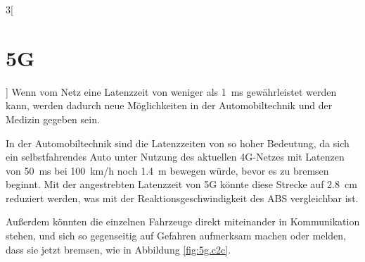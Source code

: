 \begin{multicols}{3}[\section{5G}]
Wenn vom Netz eine Latenzzeit von weniger als \SI{1}{\milli\second} gewährleistet werden kann, werden dadurch neue Möglichkeiten in der Automobiltechnik und der Medizin gegeben sein.

In der Automobiltechnik sind die Latenzzeiten von so hoher Bedeutung, da sich ein selbstfahrendes Auto unter Nutzung des aktuellen 4G-Netzes mit Latenzen von \SI{50}{\milli\second} bei \SI{100}{\kilo\metre /\hour} noch \SI{1.4}{\metre} bewegen würde, bevor es zu bremsen beginnt. Mit der angestrebten Latenzzeit von 5G könnte diese Strecke auf \SI{2.8}{\centi\metre} reduziert werden, was mit der Reaktionsgeschwindigkeit des ABS vergleichbar ist.

Außerdem könnten die einzelnen Fahrzeuge direkt miteinander in Kommunikation stehen, und sich so gegenseitig auf Gefahren aufmerksam machen oder melden, dass sie jetzt bremsen, wie in Abbildung \ref{fig:5g.c2c}.
\end{multicols}
\newpage
